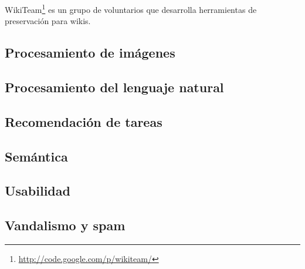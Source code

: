 \documentclass[11pt,onecolumn]{article}
\begin{document}
\citep{popitsch2010}


WikiTeam\footnote{\href{http://code.google.com/p/wikiteam/}{http://code.google.com/p/wikiteam/}} es un grupo de voluntarios que desarrolla herramientas de preservación para wikis.

\subsection{Procesamiento de imágenes}


\subsection{Procesamiento del lenguaje natural}


\subsection{Recomendación de tareas}



\subsection{Semántica}




\subsection{Usabilidad}



%

\subsection{Vandalismo y spam}

\end{document}
